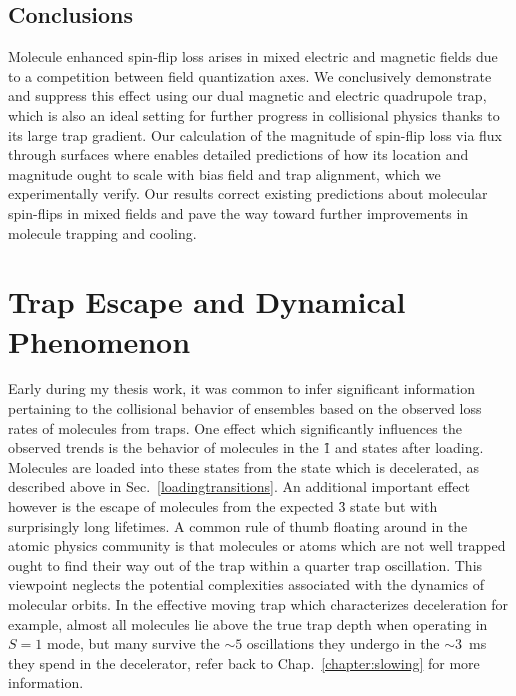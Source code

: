 \documentclass[defaultstyle,11pt]{thesis}
\begin{document}
\subsection{Conclusions}

Molecule enhanced spin-flip loss arises in mixed electric and magnetic fields due to a competition between field quantization axes.
We conclusively demonstrate and suppress this effect using our dual magnetic and electric quadrupole trap, which is also an ideal setting for further progress in collisional physics thanks to its large trap gradient.
Our calculation of the magnitude of spin-flip loss via flux through surfaces where \epb{} enables detailed predictions of how its location and magnitude ought to scale with bias field and trap alignment, which we experimentally verify.
Our results correct existing predictions about molecular spin-flips in mixed fields and pave the way toward further improvements in molecule trapping and cooling.

\section{Trap Escape and Dynamical Phenomenon}

Early during my thesis work, it was common to infer significant information pertaining to the collisional behavior of ensembles based on the observed loss rates of molecules from traps.
One effect which significantly influences the observed trends is the behavior of molecules in the \f1 and  states after loading.
Molecules are loaded into these states from the  state which is decelerated, as described above in Sec.~\ref{loadingtransitions}.
An additional important effect however is the escape of molecules from the expected \f3 state but with surprisingly long lifetimes.
A common rule of thumb floating around in the atomic physics community is that molecules or atoms which are not well trapped ought to find their way out of the trap within a quarter trap oscillation.
This viewpoint neglects the potential complexities associated with the dynamics of molecular orbits.
In the effective moving trap which characterizes deceleration for example, almost all molecules lie above the true trap depth when operating in $S=1$ mode, but many survive the $\sim5$ oscillations they undergo in the $\sim3$~ms they spend in the decelerator, refer back to Chap.~\ref{chapter:slowing} for more information.
\end{document}
